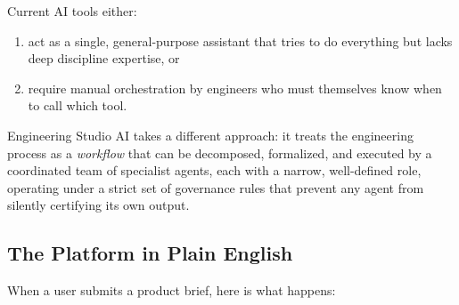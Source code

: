 \documentclass[12pt]{article}
\begin{document}
Current AI tools either:
\begin{enumerate}
    \item act as a single, general-purpose assistant that tries to do
          everything but lacks deep discipline expertise, or
    \item require manual orchestration by engineers who must themselves
          know when to call which tool.
\end{enumerate}

Engineering Studio AI takes a different approach: it treats the
engineering process as a \emph{workflow} that can be decomposed,
formalized, and executed by a coordinated team of specialist agents,
each with a narrow, well-defined role, operating under a strict set of
governance rules that prevent any agent from silently certifying its
own output.

\subsection{The Platform in Plain English}

When a user submits a product brief, here is what happens:
\end{document}

